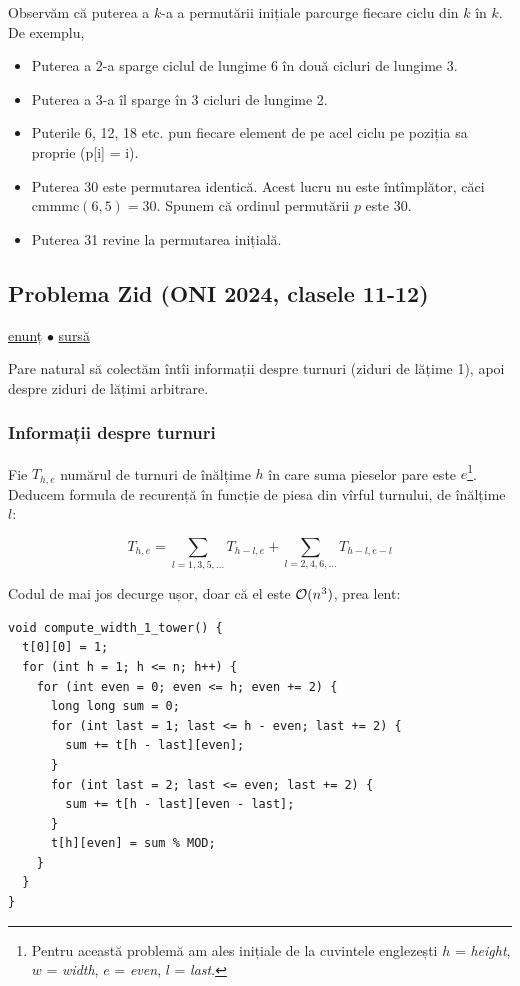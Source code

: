 \documentclass[../main.tex]{subfiles}
\begin{document}
Observăm că puterea a $k$-a a permutării inițiale parcurge fiecare ciclu din $k$ în $k$. De exemplu,

\begin{itemize}
  \item Puterea a 2-a sparge ciclul de lungime 6 în două cicluri de lungime 3.

  \item Puterea a 3-a îl sparge în 3 cicluri de lungime 2.

  \item Puterile 6, 12, 18 etc. pun fiecare element de pe acel ciclu pe poziția sa proprie (p[i] = i).

  \item Puterea 30 este permutarea identică. Acest lucru nu este întîmplător, căci $\text{cmmmc}(6,5) = 30$. Spunem că ordinul permutării $p$ este 30.

  \item Puterea 31 revine la permutarea inițială.
\end{itemize}

\subsection{Problema Zid (ONI 2024, clasele 11-12)}
\label{problem:zid}

\href{https://kilonova.ro/problems/2651}{enunț}
$\bullet$
\hyperref[code:zid]{sursă}

Pare natural să colectăm întîi informații despre turnuri (ziduri de lățime 1), apoi despre ziduri de lățimi arbitrare.

\subsubsection*{Informații despre turnuri}

Fie $T_{h,e}$ numărul de turnuri de înălțime $h$ în care suma pieselor pare este $e$\footnote{Pentru această problemă am ales inițiale de la cuvintele englezești $h$ = \textit{height}, $w$ = \textit{width}, $e$ = \textit{even}, $l$ = \textit{last}.}. Deducem formula de recurență în funcție de piesa din vîrful turnului, de înălțime $l$:

$$T_{h,e} = \sum_{l = 1, 3, 5, \dots} T_{h - l, e} + \sum_{l = 2, 4, 6, \dots} T_{h - l, e - l }$$

Codul de mai jos decurge ușor, doar că el este $\mathcal{O}(n^3)$, prea lent:

\begin{verbatim}
void compute_width_1_tower() {
  t[0][0] = 1;
  for (int h = 1; h <= n; h++) {
    for (int even = 0; even <= h; even += 2) {
      long long sum = 0;
      for (int last = 1; last <= h - even; last += 2) {
        sum += t[h - last][even];
      }
      for (int last = 2; last <= even; last += 2) {
        sum += t[h - last][even - last];
      }
      t[h][even] = sum % MOD;
    }
  }
}
\end{verbatim}
\end{document}
